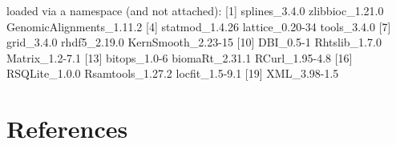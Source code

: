 \documentclass[12pt]{report}
\renewenvironment{Schunk}{\vspace{0pt}}{\vspace{0pt}}
\begin{document}
\begin{Schunk}
\begin{Soutput}
loaded via a namespace (and not attached):
 [1] splines_3.4.0            zlibbioc_1.21.0          GenomicAlignments_1.11.2
 [4] statmod_1.4.26           lattice_0.20-34          tools_3.4.0             
 [7] grid_3.4.0               rhdf5_2.19.0             KernSmooth_2.23-15      
[10] DBI_0.5-1                Rhtslib_1.7.0            Matrix_1.2-7.1          
[13] bitops_1.0-6             biomaRt_2.31.1           RCurl_1.95-4.8          
[16] RSQLite_1.0.0            Rsamtools_1.27.2         locfit_1.5-9.1          
[19] XML_3.98-1.5            
\end{Soutput}
\end{Schunk}

\section{References}


\end{document}
